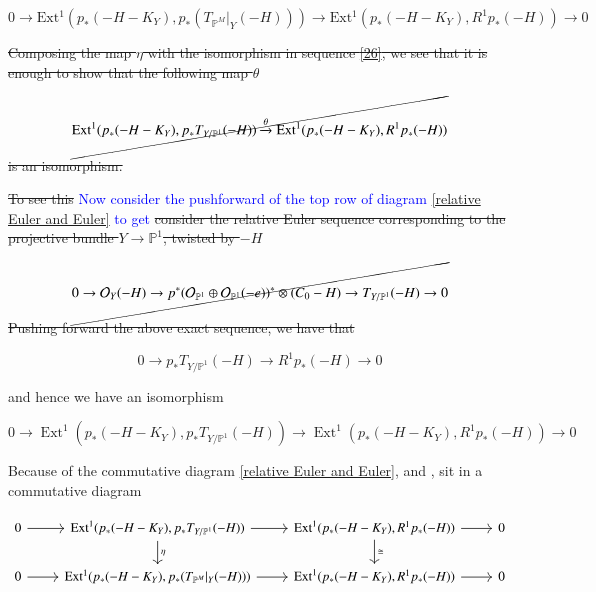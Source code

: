 \documentclass[11pt,twoside]{amsart}
\theoremstyle{plain}
\numberwithin{equation}{section}
\theoremstyle{definition}
\begin{document}
\begin{equation}\label{26}
     0 \to \operatorname{Ext^1}(p_*(-H-K_Y), 
 p_*(T_{\mathbb{P}^M}|_Y(-H))) \to \operatorname{Ext^1}(p_*(-H-K_Y), 
 R^1p_*(-H)) \to 0
 \end{equation}

\sout{Composing the map $\eta$ with the isomorphism in sequence \ref{26}, we see that it is enough to show that the following map $\theta$ }

\begin{equation}\label{27}
 \cancel{  \operatorname{Ext^1}(p_*(-H-K_Y), 
 p_*T_{Y/\mathbb{P}^1}(-H))  \xrightarrow[]{\theta} \operatorname{Ext^1}(p_*(-H-K_Y), 
 R^1p_*(-H)) }
\end{equation}

\sout{is an isomorphism. }




\sout{To see this} \textcolor{blue}{Now consider the pushforward of the top row of diagram \ref{relative Euler and Euler} to get} \sout{consider the relative Euler sequence corresponding to the projective bundle $Y \to \mathbb{P}^1$, twisted by $-H$ }

\begin{equation}\label{28}
\cancel{0 \to \mathcal{O}_Y(-H) \to p^*(\mathcal{O}_{\mathbb{P}^1} \oplus \mathcal{O}_{\mathbb{P}^1}(-e))^* \otimes (C_0-H) \to T_{Y/\mathbb{P}^1}(-H) \to 0}
\end{equation}

\sout{Pushing forward the above exact sequence, we have that }

\begin{equation}\label{29}
 0 \to p_*T_{Y/\mathbb{P}^1}(-H) \to R^1p_*(-H) \to 0 
\end{equation}

\color{blue}
and hence we have an isomorphism 

\begin{equation}\label{top hor}
 0 \to \operatorname{Ext}^1(p_*(-H-K_Y), p_*T_{Y/\mathbb{P}^1}(-H)) \to \operatorname{Ext}^1(p_*(-H-K_Y), R^1p_*(-H)) \to 0 
\end{equation}

Because of the commutative diagram \ref{relative Euler and Euler},  
 and , sit in a commutative diagram

\[
\begin{tikzcd}
0 \arrow[r] & \operatorname{Ext}^1(p_*(-H-K_Y), p_*T_{Y/\mathbb{P}^1}(-H)) \arrow[d, "\eta"] \arrow[r] & \operatorname{Ext}^1(p_*(-H-K_Y), R^1p_*(-H)) \arrow[r] \arrow[d, "\cong"] & 0 \\
0 \arrow[r] & \operatorname{Ext^1}(p_*(-H-K_Y), 
 p_*(T_{\mathbb{P}^M}|_Y(-H))) \arrow[r] & \operatorname{Ext}^1(p_*(-H-K_Y), R^1p_*(-H)) \arrow[r] & 0
\end{tikzcd}
\]
\end{document}
